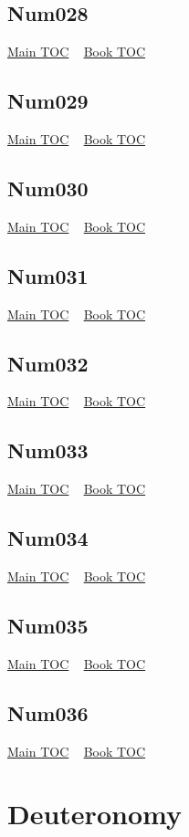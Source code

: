 \documentclass{book}
\begin{document}
  \section{Num028}\hyperlink{toc}{Main TOC} ~ \hyperref[subsec:Num]{Book TOC} 
  \section{Num029}\hyperlink{toc}{Main TOC} ~ \hyperref[subsec:Num]{Book TOC} 
  \section{Num030}\hyperlink{toc}{Main TOC} ~ \hyperref[subsec:Num]{Book TOC} 
  \section{Num031}\hyperlink{toc}{Main TOC} ~ \hyperref[subsec:Num]{Book TOC} 
  \section{Num032}\hyperlink{toc}{Main TOC} ~ \hyperref[subsec:Num]{Book TOC} 
  \section{Num033}\hyperlink{toc}{Main TOC} ~ \hyperref[subsec:Num]{Book TOC} 
  \section{Num034}\hyperlink{toc}{Main TOC} ~ \hyperref[subsec:Num]{Book TOC} 
  \section{Num035}\hyperlink{toc}{Main TOC} ~ \hyperref[subsec:Num]{Book TOC} 
  \section{Num036}\hyperlink{toc}{Main TOC} ~ \hyperref[subsec:Num]{Book TOC} 
  \chapter{Deuteronomy} \label{subsec:Deu} \begin{multicols}{2} \minitoc \end{multicols}
\end{document}
